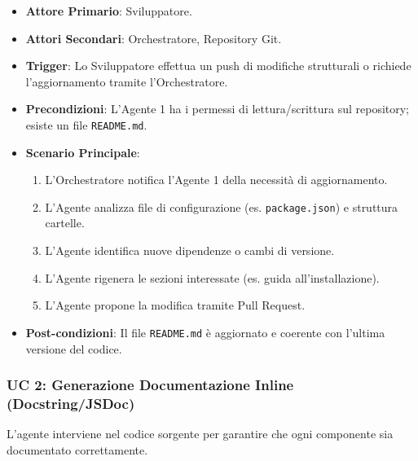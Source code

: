 \documentclass[12pt, a4paper]{article}
\begin{document}
\begin{itemize}
    \item \textbf{Attore Primario}: Sviluppatore.
    \item \textbf{Attori Secondari}: Orchestratore, Repository Git.
    \item \textbf{Trigger}: Lo Sviluppatore effettua un push di modifiche strutturali o richiede l'aggiornamento tramite l'Orchestratore.
    \item \textbf{Precondizioni}: L'Agente 1 ha i permessi di lettura/scrittura sul repository; esiste un file \texttt{README.md}.
    \item \textbf{Scenario Principale}:
        \begin{enumerate}
            \item L'Orchestratore notifica l'Agente 1 della necessità di aggiornamento.
            \item L'Agente analizza file di configurazione (es. \texttt{package.json}) e struttura cartelle.
            \item L'Agente identifica nuove dipendenze o cambi di versione.
            \item L'Agente rigenera le sezioni interessate (es. guida all'installazione).
            \item L'Agente propone la modifica tramite Pull Request.
        \end{enumerate}
    \item \textbf{Post-condizioni}: Il file \texttt{README.md} è aggiornato e coerente con l'ultima versione del codice.
\end{itemize}

\subsubsection{UC 2: Generazione Documentazione Inline (Docstring/JSDoc)}
L'agente interviene nel codice sorgente per garantire che ogni componente sia documentato correttamente.
\end{document}
